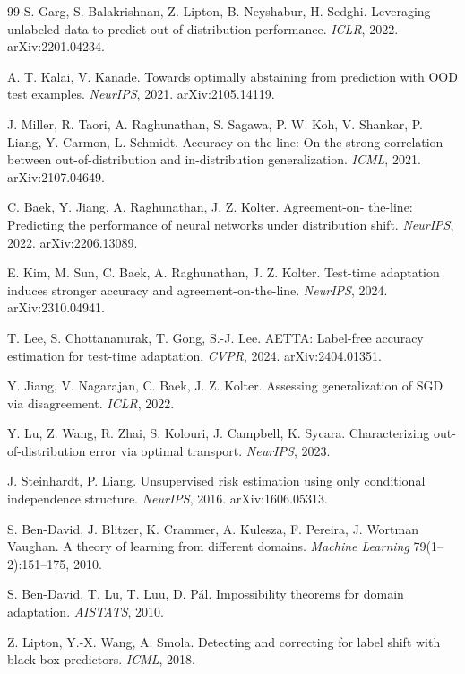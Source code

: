 \begin{thebibliography}{99}
 S. Garg, S. Balakrishnan, Z. Lipton, B. Neyshabur, H. Sedghi.
Leveraging unlabeled data to predict out-of-distribution performance. \emph{ICLR},
2022. arXiv:2201.04234.

 A. T. Kalai, V. Kanade. Towards optimally abstaining from
prediction with OOD test examples. \emph{NeurIPS}, 2021. arXiv:2105.14119.

 J. Miller, R. Taori, A. Raghunathan, S. Sagawa, P. W. Koh,
V. Shankar, P. Liang, Y. Carmon, L. Schmidt. Accuracy on the line: On the strong
correlation between out-of-distribution and in-distribution generalization.
\emph{ICML}, 2021. arXiv:2107.04649.

 C. Baek, Y. Jiang, A. Raghunathan, J. Z. Kolter. Agreement-on-
the-line: Predicting the performance of neural networks under distribution shift.
\emph{NeurIPS}, 2022. arXiv:2206.13089.

 E. Kim, M. Sun, C. Baek, A. Raghunathan, J. Z. Kolter.
Test-time adaptation induces stronger accuracy and agreement-on-the-line.
\emph{NeurIPS}, 2024. arXiv:2310.04941.

 T. Lee, S. Chottananurak, T. Gong, S.-J. Lee. AETTA:
Label-free accuracy estimation for test-time adaptation. \emph{CVPR}, 2024.
arXiv:2404.01351.

 Y. Jiang, V. Nagarajan, C. Baek, J. Z. Kolter. Assessing
generalization of SGD via disagreement. \emph{ICLR}, 2022.

 Y. Lu, Z. Wang, R. Zhai, S. Kolouri, J. Campbell, K. Sycara.
Characterizing out-of-distribution error via optimal transport. \emph{NeurIPS}, 2023.

 J. Steinhardt, P. Liang. Unsupervised risk estimation using
only conditional independence structure. \emph{NeurIPS}, 2016. arXiv:1606.05313.

 S. Ben-David, J. Blitzer, K. Crammer, A. Kulesza,
F. Pereira, J. Wortman Vaughan. A theory of learning from different domains.
\emph{Machine Learning} 79(1--2):151--175, 2010.

 S. Ben-David, T. Lu, T. Luu, D. P\'al.
Impossibility theorems for domain adaptation. \emph{AISTATS}, 2010.

 Z. Lipton, Y.-X. Wang, A. Smola. Detecting and correcting
for label shift with black box predictors. \emph{ICML}, 2018.


\end{thebibliography}
